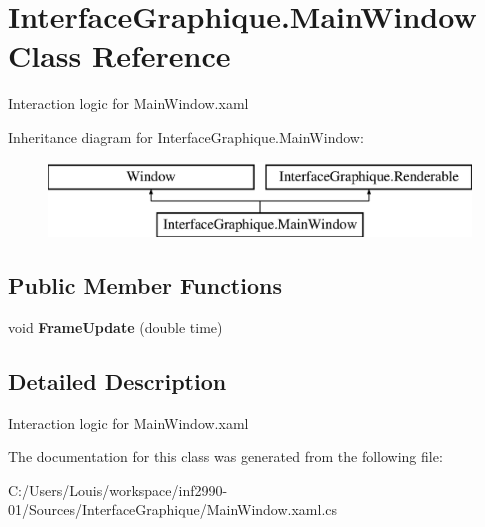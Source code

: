 \hypertarget{class_interface_graphique_1_1_main_window}{}\section{Interface\+Graphique.\+Main\+Window Class Reference}
\label{class_interface_graphique_1_1_main_window}


Interaction logic for Main\+Window.\+xaml  


Inheritance diagram for Interface\+Graphique.\+Main\+Window\+:\begin{figure}[H]
\begin{center}
\leavevmode
\includegraphics[height=2.000000cm]{class_interface_graphique_1_1_main_window}
\end{center}
\end{figure}
\subsection*{Public Member Functions}
\begin{DoxyCompactItemize}
\item 
\hypertarget{class_interface_graphique_1_1_main_window_af11d0f6c1d6519e421d5704f6a19c934}{}void {\bfseries Frame\+Update} (double time)\label{class_interface_graphique_1_1_main_window_af11d0f6c1d6519e421d5704f6a19c934}

\end{DoxyCompactItemize}


\subsection{Detailed Description}
Interaction logic for Main\+Window.\+xaml 



The documentation for this class was generated from the following file\+:\begin{DoxyCompactItemize}
\item 
C\+:/\+Users/\+Louis/workspace/inf2990-\/01/\+Sources/\+Interface\+Graphique/Main\+Window.\+xaml.\+cs\end{DoxyCompactItemize}
